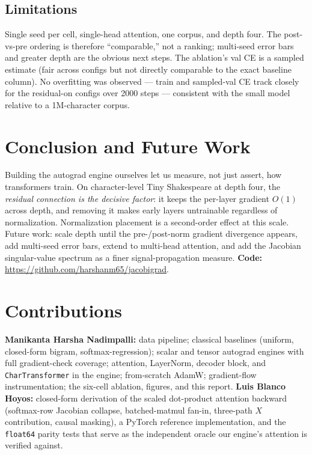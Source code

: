 \documentclass{article}
\begin{document}
\subsection{Limitations} Single seed per cell, single-head attention, one corpus, and depth four. The post-vs-pre ordering is therefore ``comparable,'' not a ranking; multi-seed error bars and greater depth are the obvious next steps. The ablation's val CE is a sampled estimate (fair across configs but not directly comparable to the exact baseline column). No overfitting was observed — train and sampled-val CE track closely for the residual-on configs over 2000 steps — consistent with the small model relative to a 1M-character corpus.

\section{Conclusion and Future Work}
Building the autograd engine ourselves let us measure, not just assert, how transformers train. On character-level Tiny Shakespeare at depth four, the \emph{residual connection is the decisive factor}: it keeps the per-layer gradient $O(1)$ across depth, and removing it makes early layers untrainable regardless of normalization. Normalization placement is a second-order effect at this scale. Future work: scale depth until the pre-/post-norm gradient divergence appears, add multi-seed error bars, extend to multi-head attention, and add the Jacobian singular-value spectrum as a finer signal-propagation measure. \textbf{Code:} \url{https://github.com/harshanm65/jacobigrad}.

\section*{Contributions}
\textbf{Manikanta Harsha Nadimpalli:} data pipeline; classical baselines (uniform, closed-form bigram, softmax-regression); scalar and tensor autograd engines with full gradient-check coverage; attention, LayerNorm, decoder block, and \texttt{CharTransformer} in the engine; from-scratch AdamW; gradient-flow instrumentation; the six-cell ablation, figures, and this report.
\textbf{Luis Blanco Hoyos:} closed-form derivation of the scaled dot-product attention backward (softmax-row Jacobian collapse, batched-matmul fan-in, three-path $X$ contribution, causal masking), a PyTorch reference implementation, and the \texttt{float64} parity tests that serve as the independent oracle our engine's attention is verified against.
\end{document}
